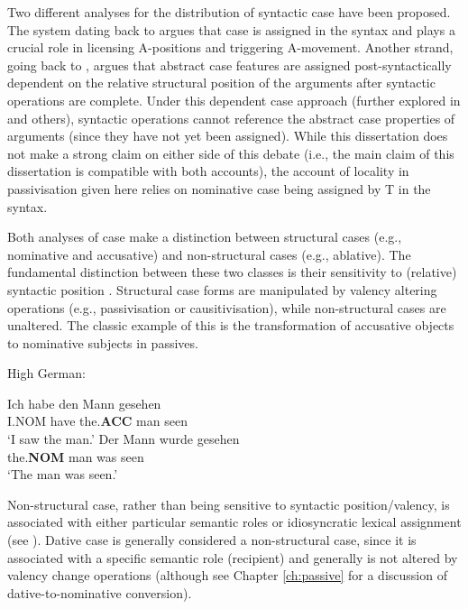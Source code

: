 Two different analyses for the distribution of syntactic case have been proposed. The system dating back to \cite{Vergnaud.1977} argues that case is assigned in the syntax and plays a crucial role in licensing A-positions and triggering A-movement. Another strand, going back to \cite{Yip.1987}, argues that abstract case features are assigned post-syntactically dependent on the relative structural position of the arguments after syntactic operations are complete. Under this dependent case approach (further explored in \citealt{Marantz.1991,McFadden.2004} and others), syntactic operations cannot reference the abstract case properties of arguments (since they have not yet been assigned). While this dissertation does not make a strong claim on either side of this debate (i.e., the main claim of this dissertation is compatible with both accounts), the account of locality in passivisation given here relies on nominative case being assigned by T in the syntax. 

Both analyses of case make a distinction between structural cases (e.g., nominative and accusative) and non-structural cases (e.g., ablative). The fundamental distinction between these two classes is their sensitivity to (relative) syntactic position \citep{Woolford.2006}. Structural case forms are manipulated by valency altering operations (e.g., passivisation or causitivisation), while non-structural cases are unaltered. The classic example of this is the transformation of accusative objects to nominative subjects in passives.

\begin{exe}
	\ex High German:\label{ex:hg-accnom}
	\begin{xlist}
		\ex \gll Ich habe den Mann gesehen\\
		I.NOM have the.\textbf{ACC} man seen\\
		\trans `I saw the man.'
		\ex \gll Der Mann wurde gesehen\\
		the.\textbf{NOM} man was seen\\
		\trans `The man was seen.'
	\end{xlist}
\end{exe}

Non-structural case, rather than being sensitive to syntactic position/valency, is associated with either particular semantic roles or idiosyncratic lexical assignment (see \citealt{Woolford.2006}). Dative case is generally considered a non-structural case, since it is associated with a specific semantic role (recipient) and generally is not altered by valency change operations (although see Chapter \ref{ch:passive} for a discussion of dative-to-nominative conversion).

